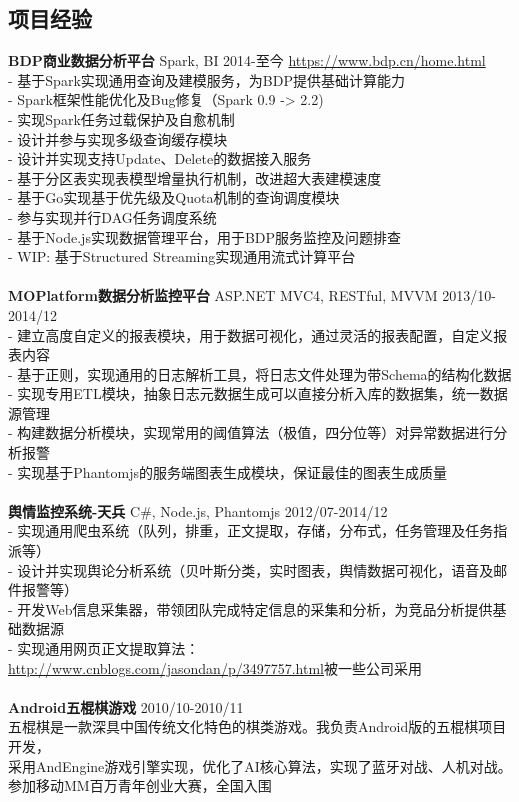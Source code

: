 \documentclass[UTF8,margin,line]{res}
\begin{document}
\begin{resume}
\section{\sc 项目经验}
\textbf{BDP商业数据分析平台} Spark, BI 2014-至今 \url{https://www.bdp.cn/home.html} \\
- 基于Spark实现通用查询及建模服务，为BDP提供基础计算能力 \\
- Spark框架性能优化及Bug修复（Spark 0.9 -> 2.2) \\
- 实现Spark任务过载保护及自愈机制 \\
- 设计并参与实现多级查询缓存模块 \\
- 设计并实现支持Update、Delete的数据接入服务 \\
- 基于分区表实现表模型增量执行机制，改进超大表建模速度 \\
- 基于Go实现基于优先级及Quota机制的查询调度模块 \\
- 参与实现并行DAG任务调度系统 \\
- 基于Node.js实现数据管理平台，用于BDP服务监控及问题排查 \\
- WIP: 基于Structured Streaming实现通用流式计算平台 \\
\\
\textbf{MOPlatform数据分析监控平台} ASP.NET MVC4, RESTful, MVVM 2013/10-2014/12 \\
- 建立高度自定义的报表模块，用于数据可视化，通过灵活的报表配置，自定义报表内容 \\
- 基于正则，实现通用的日志解析工具，将日志文件处理为带Schema的结构化数据 \\
- 实现专用ETL模块，抽象日志元数据生成可以直接分析入库的数据集，统一数据源管理 \\
- 构建数据分析模块，实现常用的阈值算法（极值，四分位等）对异常数据进行分析报警 \\
- 实现基于Phantomjs的服务端图表生成模块，保证最佳的图表生成质量 \\
\\
\textbf{舆情监控系统-天兵} C\#, Node.js, Phantomjs 2012/07-2014/12 \\
- 实现通用爬虫系统（队列，排重，正文提取，存储，分布式，任务管理及任务指派等） \\
- 设计并实现舆论分析系统（贝叶斯分类，实时图表，舆情数据可视化，语音及邮件报警等） \\
- 开发Web信息采集器，带领团队完成特定信息的采集和分析，为竞品分析提供基础数据源 \\
- 实现通用网页正文提取算法：\url{http://www.cnblogs.com/jasondan/p/3497757.html}被一些公司采用 \\
\\
\textbf{Android五棍棋游戏}  2010/10-2010/11 \\
五棍棋是一款深具中国传统文化特色的棋类游戏。我负责Android版的五棍棋项目开发，\\
采用AndEngine游戏引擎实现，优化了AI核心算法，实现了蓝牙对战、人机对战。\\
参加移动MM百万青年创业大赛，全国入围


\end{resume}
\end{document}
